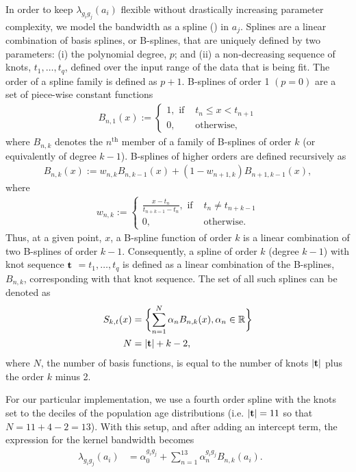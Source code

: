 In order to keep $\lambda_{g_ig_j}(a_i)$ flexible without drastically increasing parameter complexity, we model the bandwidth as a spline (\citet{DeBoor:1978}) in $a_j$. Splines are a linear combination of basis splines, or B-splines, that are uniquely defined by two parameters: (i) the polynomial degree, $p$; and (ii) a non-decreasing sequence of knots, $t_1, \dots , t_q$, defined over the input range of the data that is being fit. The order of a spline family is defined as $p + 1$. B-splines of order 1 $(p = 0)$ are a set of piece-wise constant functions
\begin{align}
B_{n,1}(x) := 
\begin{cases}
1, \text{ if } & t_n \leq x < t_{n+1} \\
0, & \text{otherwise, }
\end{cases}
\end{align}
where $B_{n,k}$ denotes the $n^{\text{th}}$ member of a family of B-splines of order $k$ (or equivalently of degree $k-1$). B-splines of higher orders are defined recursively as
\begin{align}
B_{n,k}(x) := w_{n,k} B_{n,k-1}(x) + (1 - w_{n+1,k})B_{n+1,k-1}(x),
\end{align}
where
\begin{align}
w_{n,k} := 
\begin{cases}
\frac{x-t_n}{t_{n+k-1}-t_n}, \text{ if } & t_n \neq t_{n+k-1} \\
0, & \text{otherwise.}
\end{cases}
\end{align}
Thus, at a given point, $x$, a B-spline function of order $k$ is a linear combination of two B-splines of order $k-1$. Consequently, a spline of order $k$ (degree $k-1$) with knot sequence ${\bf t}$ $= t_1,\dots,t_q$ is defined as a linear combination of the B-splines, $B_{n,k}$, corresponding with that knot sequence. The set of all such splines can be denoted as
\begin{align}
S_{k,t}(x) &= \biggl\{  \sum_{n=1}^N \alpha_n B_{n,k}(x), \alpha_n \in \mathbb{R} \biggr\} \\ \nonumber
N &= |{\bf t}| + k - 2,
\end{align}
where $N$, the number of basis functions, is equal to the number of knots $|{\bf t}|$ plus the order $k$ minus 2.

For our particular implementation, we use a fourth order spline with the knots set to the deciles of the population age distributions (i.e. $|{\bf t}| = 11$ so that $N = 11 + 4 - 2 = 13$). With this setup, and after adding an intercept term, the expression for the kernel bandwidth becomes
\begin{align}
\lambda_{g_ig_j}(a_i) &= \alpha_0^{g_ig_j} + \sum_{n=1}^{13} \alpha_n^{g_ig_j} B_{n,k}(a_i). && \label{eq:kernel_spline}
\end{align}

